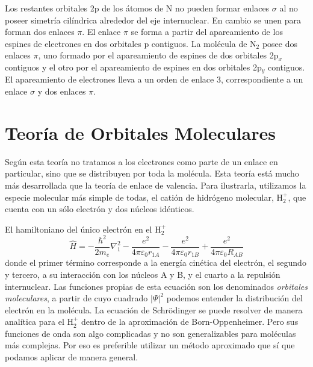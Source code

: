 \documentclass{tufte-handout}
\begin{document}
Los restantes orbitales 2p de los átomos de N no pueden
formar enlaces $\sigma$ al no poseer simetría
cilíndrica alrededor del eje internuclear. En cambio se 
unen para forman dos enlaces $\pi$. El enlace $\pi$ se
forma a partir del apareamiento de los espines de 
electrones en dos orbitales p contiguos.
La molécula de N$_2$ posee dos enlaces $\pi$, uno formado
por el apareamiento de espines de dos orbitales 2p$_x$
contiguos y el otro por el apareamiento de espines en
dos orbitales 2p$_y$ contiguos. El apareamiento de
electrones lleva a un orden de enlace 3, correspondiente 
a un enlace $\sigma$ y dos enlaces $\pi$.


\section{Teoría de Orbitales Moleculares}
Según esta teoría no tratamos a los electrones como
parte de un enlace en particular, sino que se distribuyen
por toda la molécula. Esta teoría está mucho más desarrollada
que la teoría de enlace de valencia. Para ilustrarla,
utilizamos la especie molecular más simple de todas, el 
catión de hidrógeno molecular, H$^+_2$, que cuenta con un sólo
electrón y dos núcleos idénticos. 

El hamiltoniano del único electrón en el H$^+_2$
\begin{equation}
\hat{H}=-\frac{\hbar^2}{2m_e}\nabla^2_1-
\frac{e^2}{4\pi \varepsilon_0r_{1A}} - 
\frac{e^2}{4\pi \varepsilon_0r_{1B}} +
\frac{e^2}{4\pi \varepsilon_0R_{AB}}
\label{eq:hamiltonian_h2}
\end{equation}
donde el primer término corresponde a la energía cinética
del electrón, el segundo y tercero, a su interacción 
con los núcleos A y B, y el cuarto a la repulsión internuclear.
Las funciones propias de esta ecuación son los denominados
\textit{orbitales moleculares}, a partir de cuyo cuadrado
$|\Psi|^2$ podemos entender la distribución del electrón en la molécula. 
La ecuación de Schrödinger se puede resolver de manera analítica para el H$^+_2$ dentro de la aproximación de Born-Oppenheimer. 
Pero sus funciones de onda son algo complicadas y no son generalizables para moléculas más complejas.
Por eso es preferible utilizar un método aproximado que sí que podamos aplicar de manera general.
\end{document}
